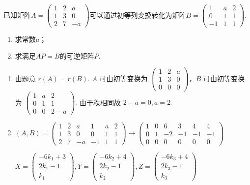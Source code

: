 \begin{exercise}
\begin{exgroup}
        \item 已知矩阵$A=\begin{pmatrix}1 & 2 & a  \\
            1 & 3 & 0  \\
            2 & 7 & -a\end{pmatrix}$可以通过初等列变换转化为矩阵$B=\begin{pmatrix}1  & a & 2 \\
            0  & 1 & 1 \\
            -1 & 1 & 1\end{pmatrix}$.
        \begin{enumerate}
            \item 求常数$a$；
            \item 求满足$AP=B$的可逆矩阵$P$.
        \end{enumerate}
        \begin{answer}
            \begin{enumerate}
                \item 由题意 $r(A)=r(B)$. $A$ 可由初等变换为 $\begin{pmatrix}1 & 2 & a \\ 1 & 3 & 0 \\ 0 & 0 & 0\end{pmatrix}$，$B$ 可由初等变换为 $\begin{pmatrix}1 & a & 2 \\ 0 & 1 & 1 \\ 0 & 0 & 2-a\end{pmatrix}$. 由于秩相同故 $2-a=0,a=2$.

                \item $(A,B)=\begin{pmatrix}1 & 2 & a & 1 & a & 2 \\ 1 & 3 & 0 & 0 & 1 & 1 \\ 2 & 7 & -a & -1 & 1 & 1\end{pmatrix}\rightarrow\begin{pmatrix}1 & 0 & 6 & 3 & 4 & 4 \\ 0 & 1 & -2 & -1 & -1 & -1 \\ 0 & 0 & 0 & 0 & 0 & 0\end{pmatrix}$

                        $X = \begin{pmatrix}-6k_1+3 \\ 2k_1-1 \\ k_1\end{pmatrix},Y = \begin{pmatrix}-6k_2+4 \\ 2k_2-1 \\ k_2\end{pmatrix},Z = \begin{pmatrix}-6k_3+4 \\ 2k_3-1 \\ k_3\end{pmatrix}$


\end{enumerate}
\end{answer}
\end{exgroup}
\end{exercise}
